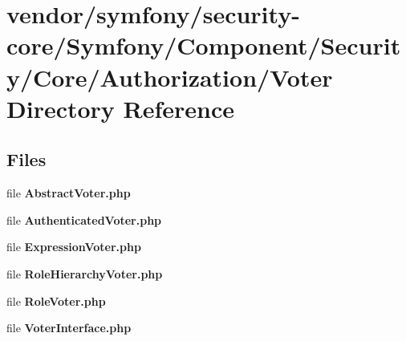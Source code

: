 \section{vendor/symfony/security-\/core/\+Symfony/\+Component/\+Security/\+Core/\+Authorization/\+Voter Directory Reference}
\label{dir_6667bac9023014f25c76ed6cff49ae56}
\subsection*{Files}
\begin{DoxyCompactItemize}
\item 
file {\bf Abstract\+Voter.\+php}
\item 
file {\bf Authenticated\+Voter.\+php}
\item 
file {\bf Expression\+Voter.\+php}
\item 
file {\bf Role\+Hierarchy\+Voter.\+php}
\item 
file {\bf Role\+Voter.\+php}
\item 
file {\bf Voter\+Interface.\+php}
\end{DoxyCompactItemize}
